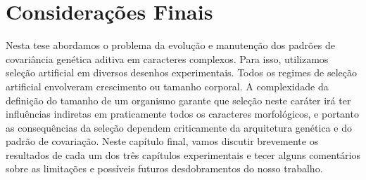 \pagestyle{empty}
\cleardoublepage
\pagestyle{fancy}



\chapter{Considerações Finais}

\begin{refsection}

Nesta tese abordamos o problema da evolução e manutenção dos padrões de
covariância genética aditiva em caracteres complexos. Para isso, utilizamos
seleção artificial em diversos desenhos experimentais. Todos os regimes de
seleção artificial envolveram crescimento ou tamanho corporal. A complexidade
da definição do tamanho de um organismo garante que seleção neste caráter irá
ter influências indiretas em praticamente todos os caracteres morfológicos, e
portanto as consequências da seleção dependem criticamente da arquitetura
genética e do padrão de covariação. Neste capítulo final, vamos discutir
brevemente os resultados de cada um dos três capítulos experimentais e tecer
alguns comentários sobre as limitações e possíveis futuros desdobramentos do
nosso trabalho.


\end{refsection}
